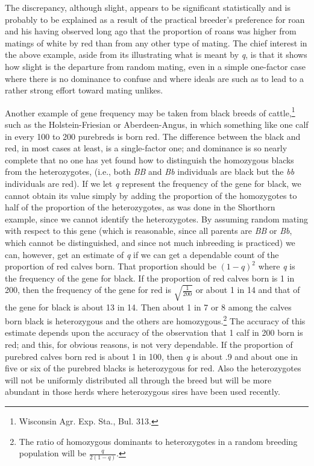\noindent
The discrepancy, although slight, appears to be significant statistically
and is probably to be explained as a result of the practical breeder's
preference for roan and his having observed long ago that the proportion
of roans was higher from matings of white by red than from any
other type of mating. The chief interest in the above example, aside
from its illustrating what is meant by \textit{q}, is that it shows how slight is
the departure from random mating, even in a simple one-factor case
where there is no dominance to confuse and where ideals are such as to
lead to a rather strong effort toward mating unlikes.

Another example of gene frequency may be taken from black breeds
of cattle,\footnote{Wisconsin Agr. Exp. Sta., Bul. 313.} such as
the Holstein-Friesian or Aberdeen-Angus, in which something like
one calf in every 100 to 200 purebreds is born red. The difference
between the black and red, in most cases at least, is a single-factor
one; and dominance is so nearly complete that no one has yet
found how to distinguish the homozygous blacks from the heterozygotes,
(i.e., both \textit{BB} and \textit{Bb} individuals are black but the
\textit{bb} individuals are red). If we let \textit{q} represent the
frequency of the gene for black, we cannot obtain its value simply by
adding the proportion of the homozygotes to half of the proportion of
the heterozygotes, as was done in the Shorthorn example, since we cannot
identify the heterozygotes. By assuming random mating with respect to this
gene (which is reasonable, since all parents are \textit{BB} or \textit{Bb},
which cannot be distinguished, and since not much inbreeding is practiced)
we can, however, get an estimate of \textit{q} if we can get a dependable
count of the proportion of red calves born. That proportion should be $(1 - q)^2$
where \textit{q} is the frequency of the gene for black. If the proportion of red
calves born is 1 in 200, then the frequency of the gene for red is $\sqrt{\frac{1}{200}}$
or about 1 in 14 and that of the gene for black is about 13 in 14. Then
about 1 in 7 or 8 among the calves born black is heterozygous and the
others are homozygous.\footnote{The ratio of homozygous dominants to heterozygotes in
a random breeding population will be $\frac{q}{2(1-q)}$.}
The accuracy of this estimate depends upon the accuracy of the observation that 1 calf
in 200 born is red; and this, for obvious reasons, is not very dependable. If the
proportion of purebred calves born red is about 1 in 100, then \textit{q} is about .9
and about one in five or six of the purebred blacks is heterozygous for red. Also the
heterozygotes will not be uniformly distributed all through the breed but will be more
abundant in those herds where heterozygous sires have been used recently.

